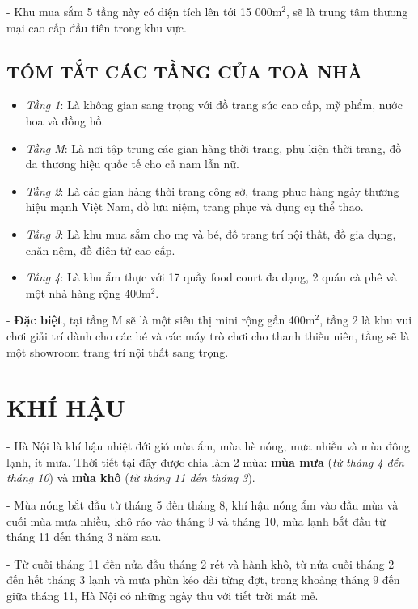 	- Khu mua sắm 5 tầng này có diện tích lên tới 15 000m$^{2}$, sẽ là trung tâm thương mại cao cấp đầu tiên trong khu vực.
	
	\subsection{TÓM TẮT CÁC TẦNG CỦA TOÀ NHÀ}
	\begin{itemize}
	\setlength\itemsep{1mm}
		\item \emph{Tầng 1}: Là không gian sang trọng với đồ trang sức cao cấp, mỹ phẩm, nước hoa và đồng hồ.
	
		\item \emph{Tầng M}: Là nơi tập trung các gian hàng thời trang, phụ kiện thời trang, đồ da thương hiệu quốc tế cho cả nam lẫn nữ.
	
		\item \emph{Tầng 2}: Là các gian hàng thời trang công sở, trang phục hàng ngày thương hiệu mạnh Việt Nam, đồ lưu niệm, trang phục và dụng cụ thể thao.
	
		\item \emph{Tầng 3}: Là khu mua sắm cho mẹ và bé, đồ trang trí nội thất, đồ gia dụng, chăn nệm, đồ điện tử cao cấp.
	
		\item \emph{Tầng 4}: Là khu ẩm thực với 17 quầy food court đa dạng, 2 quán cà phê và một nhà hàng rộng 400m$^{2}$.
	\end{itemize}
	
	- \textbf{Đặc biệt}, tại tầng M sẽ là một siêu thị mini rộng gần 400m$^{2}$, tầng 2 là khu vui chơi giải trí dành cho các bé và các máy trò chơi cho thanh thiếu niên, tầng sẽ là một showroom trang trí nội thất sang trọng.
	
	\section{KHÍ HẬU}
	- Hà Nội là khí hậu nhiệt đới gió mùa ẩm, mùa hè nóng, mưa nhiều và mùa đông lạnh, ít mưa. Thời tiết tại đây được chia làm 2 mùa: \textbf{mùa mưa} (\emph{từ tháng 4 đến tháng 10}) và \textbf{mùa khô} (\emph{từ tháng 11 đến tháng 3}).
	
	- Mùa nóng bắt đầu từ tháng 5 đến tháng 8, khí hậu nóng ẩm vào đầu mùa và cuối mùa mưa nhiều, khô ráo vào tháng 9 và tháng 10, mùa lạnh bắt đầu từ tháng 11 đến tháng 3 năm sau.
	
	- Từ cuối tháng 11 đến nửa đầu tháng 2 rét và hành khô, từ nửa cuối tháng 2 đến hết tháng 3 lạnh và mưa phùn kéo dài từng đợt, trong khoảng tháng 9 đến giữa tháng 11, Hà Nội có những ngày thu với tiết trời mát mẻ.
	
